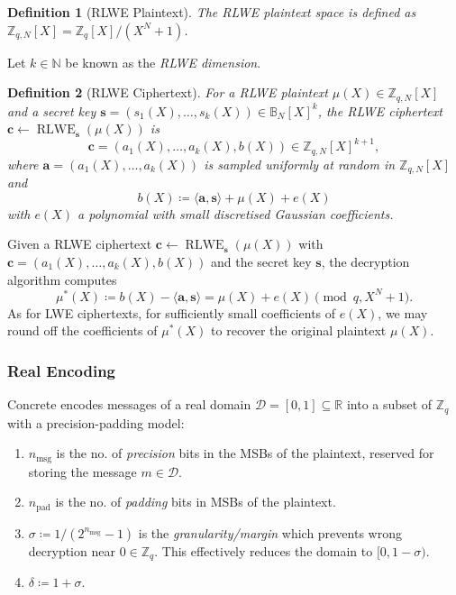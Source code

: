 \documentclass{article}
\newtheorem{definition}{Definition}
\DeclareMathOperator{\rlwe}{RLWE}
\begin{document}
\begin{definition}[RLWE Plaintext]
  The RLWE plaintext space is defined as $\mathbb{Z}_{q,N}[X] = \mathbb{Z}_q[X]/(X^N +
  1)$.
\end{definition}

Let $k \in \mathbb{N}$ be known as the \emph{RLWE dimension}.

\begin{definition}[RLWE Ciphertext]
  For a RLWE plaintext $\mu(X) \in \mathbb{Z}_{q,N}[X]$ and a secret key $\bm{s} =
  (s_1(X), \ldots, s_k(X)) \in \mathbb{B}_N[X]^k$, the RLWE ciphertext $\bm{c}
  \leftarrow \rlwe_{\bm{s}}(\mu(X))$ is \begin{equation}
    \bm{c} = (a_1(X), \ldots, a_k(X), b(X)) \in \mathbb{Z}_{q,N}[X]^{k+1},
  \end{equation} where $\bm{a} = (a_1(X), \ldots, a_k(X))$ is sampled uniformly at
  random in $\mathbb{Z}_{q,N}[X]$ and \begin{equation}
    b(X) \coloneqq \langle \mathbf{a}, \mathbf{s} \rangle + \mu(X) + e(X)
  \end{equation} with $e(X)$ a polynomial with small discretised Gaussian coefficients.
\end{definition}

Given a RLWE ciphertext $\bm{c} \leftarrow \rlwe_{\bm{s}}(\mu(X))$ with $\bm{c} =
(a_1(X), \ldots, a_k(X), b(X))$ and the secret key $\bm{s}$, the decryption algorithm
computes \begin{equation}
  \mu^*(X) \coloneqq b(X) - \langle \bm{a}, \bm{s} \rangle = \mu(X) + e(X)
  \pmod{q, X^N + 1}.
\end{equation}
As for LWE ciphertexts, for sufficiently small coefficients of $e(X)$, we may round off
the coefficients of $\mu^*(X)$ to recover the original plaintext $\mu(X)$.

\subsubsection{Real Encoding}

Concrete encodes messages of a real domain $\mathscr{D} = [0, 1] \subseteq \mathbb{R}$
into a subset of $\mathbb{Z}_q$ with a precision-padding model: \begin{enumerate}
  \item $n_{\text{msg}}$ is the no. of \emph{precision} bits in the MSBs of the
    plaintext, reserved for storing the message $m \in \mathscr{D}$.
  \item $n_{\text{pad}}$ is the no. of \emph{padding} bits in MSBs of the plaintext.
  \item $\sigma \coloneqq 1/(2^{n_{\text{msg}}} - 1)$ is the \emph{granularity/margin}
    which prevents wrong decryption near $0 \in \mathbb{Z}_q$. This effectively reduces
    the domain to $[0, 1 - \sigma)$.
  \item $\delta \coloneqq 1 + \sigma$.
\end{enumerate}
\end{document}

